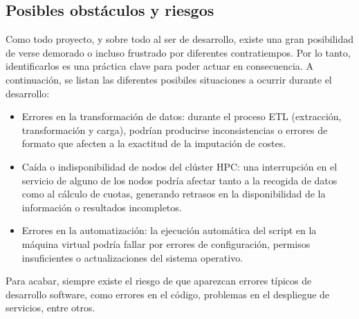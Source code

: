 \subsection{Posibles obstáculos y riesgos}
Como todo proyecto, y sobre todo al ser de desarrollo, existe una gran posibilidad de verse 
demorado o incluso frustrado por diferentes contratiempos. Por lo tanto, identificarlos es una 
práctica clave para poder actuar en consecuencia. A continuación, se listan las diferentes posibiles situaciones
a ocurrir durante el desarrollo:
\begin{itemize}
    \item Errores en la transformación de datos: durante el proceso ETL (extracción, transformación y carga), 
    podrían producirse inconsistencias o errores de formato que afecten a la exactitud de la imputación de costes.
    \item Caída o indisponibilidad de nodos del clúster HPC: una interrupción en el servicio de alguno de los nodos 
    podría afectar tanto a la recogida de datos como al cálculo de cuotas, generando retrasos en la disponibilidad 
    de la información o resultados incompletos.
    \item Errores en la automatización: la ejecución automática del script en la máquina virtual podría fallar por 
    errores de configuración, permisos insuficientes o actualizaciones del sistema operativo.
\end{itemize}
Para acabar, siempre existe el riesgo de que aparezcan errores típicos de desarrollo software, como errores en el código, problemas en el despliegue
de servicios, entre otros.
